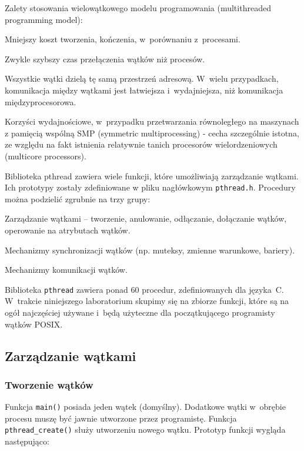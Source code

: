 Zalety stosowania wielowątkowego modelu programowania (multithreaded programming model):

\begin{myitemize}
\item Mniejszy koszt tworzenia, kończenia, w~porównaniu z~procesami.
\item Zwykle szybszy czas przełączenia wątków niż procesów.
\item Wszystkie wątki dzielą tę samą przestrzeń adresową. W~wielu przypadkach, komunikacja między wątkami jest łatwiejsza i~wydajniejsza, niż komunikacja międzyprocesorowa.
\item Korzyści wydajnościowe, w~przypadku przetwarzania równoległego na maszynach z pamięcią wspólną SMP (symmetric multiprocessing) - cecha szczególnie istotna, ze względu na fakt istnienia relatywnie tanich procesorów wielordzeniowych (multicore processors).
\end{myitemize}

Biblioteka pthread zawiera wiele funkcji, które umożliwiają zarządzanie wątkami. Ich prototypy zostały zdefiniowane w pliku nagłówkowym \lstinline[style=MyBashStyle]{pthread.h}.  Procedury można podzielić zgrubnie na trzy grupy:

\begin{myitemize}
\item Zarządzanie wątkami – tworzenie, anulowanie, odłączanie, dołączanie wątków, operowanie na atrybutach wątków.
\item Mechanizmy synchronizacji wątków (np. muteksy, zmienne warunkowe, bariery).
\item Mechanizmy komunikacji wątków.
\end{myitemize}

Biblioteka \lstinline[style=MyBashStyle]{pthread} zawiera ponad 60 procedur, zdefiniowanych dla języka~C. W~trakcie niniejszego laboratorium skupimy się na zbiorze funkcji, które są na ogół najczęściej używane i~będą użyteczne dla początkującego programisty wątków POSIX.

\subsection{Zarządzanie wątkami}
\subsubsection{Tworzenie wątków}

Funkcja \lstinline[style=MyCStyle]{main()} posiada jeden wątek (domyślny). Dodatkowe wątki w~obrębie procesu muszę być jawnie utworzone przez programistę. Funkcja \lstinline[style=MyCStyle]{pthread_create()} służy utworzeniu nowego wątku. Prototyp funkcji wygląda następująco:



